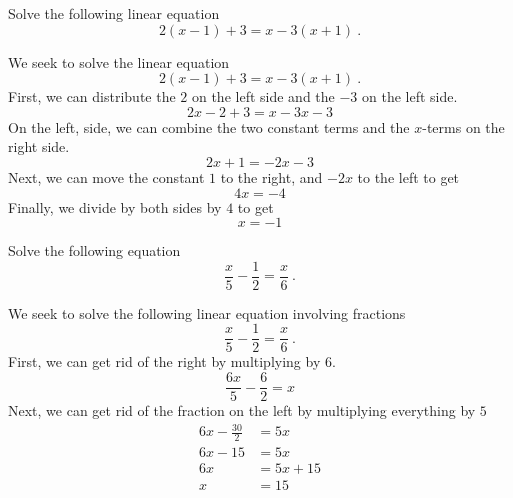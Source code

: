 \documentclass[addpoints,12pt]{exam}
\begin{document}
\begin{center}
\end{center}
\vspace{0.1in}
\vspace{0.2in}




\begin{questions}
	\question Solve the following linear equation 
   \[
 2(x-1)+3 = x-3(x+1)~.
\]

 \begin{solution}
We seek to solve the linear equation 
   \[
 2(x-1)+3 = x-3(x+1)~.
\]
First, we can distribute the $2$ on the left side and the $-3$ on the left side. 
\[
2x-2 +3 = x - 3x -3 
\]
On the left, side, we can combine the two constant terms and the $x$-terms on the right side. 
\[
2x +1 = -2x -3
\]
Next, we can move the constant $1$ to the right, and $-2x$ to the left to get 
\[
4x = -4 
\]
Finally, we divide by both sides by $4$ to get 
\[
x = -1 
\]
 \end{solution}
 
\question Solve the following equation 
\[
 \frac{x}{5}- \frac{1}{2} = \frac{x}{6}~.
\]

\begin{solution}
	We seek to solve the following  linear equation involving fractions 
\[
 \frac{x}{5}- \frac{1}{2} = \frac{x}{6}~.
\]
    First, we can get rid of the right by multiplying by $6$. 
		\[
		 \frac{6x}{5} - \frac{6}{2} = x
	 \] 
	 Next, we can get rid of the fraction on the left by multiplying everything by $5$ 
	 \begin{align*}
		 6x - \frac{30}{2} & = 5x \\
		 6x - 15 & = 5x \\
		 6x & = 5x + 15 \\
		 x & = 15 \\
	 \end{align*}
\end{solution}


\end{questions}
\end{document}
